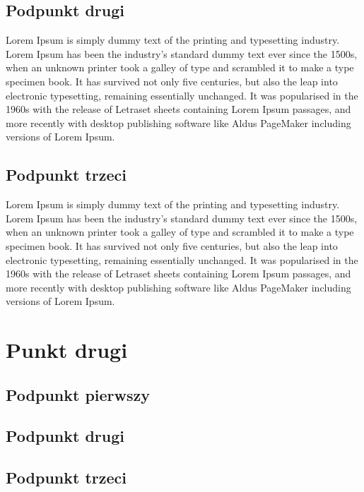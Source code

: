         \subsection{Podpunkt drugi}
            Lorem Ipsum is simply dummy text of the printing and typesetting industry. Lorem Ipsum has been the industry's standard dummy text ever since the 1500s, when an unknown printer took a galley of type and scrambled it to make a type specimen book. It has survived not only five centuries, but also the leap into electronic typesetting, remaining essentially unchanged. It was popularised in the 1960s with the release of Letraset sheets containing Lorem Ipsum passages, and more recently with desktop publishing software like Aldus PageMaker including versions of Lorem Ipsum.
        \subsection{Podpunkt trzeci}
            Lorem Ipsum is simply dummy text of the printing and typesetting industry. Lorem Ipsum has been the industry's standard dummy text ever since the 1500s, when an unknown printer took a galley of type and scrambled it to make a type specimen book. It has survived not only five centuries, but also the leap into electronic typesetting, remaining essentially unchanged. It was popularised in the 1960s with the release of Letraset sheets containing Lorem Ipsum passages, and more recently with desktop publishing software like Aldus PageMaker including versions of Lorem Ipsum.  
    \section{Punkt drugi}
        \subsection{Podpunkt pierwszy}
        \subsection{Podpunkt drugi}
        \subsection{Podpunkt trzeci}


